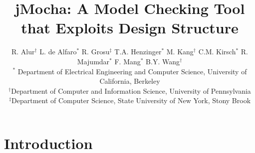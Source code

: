 \documentclass[10pt,twocolumn]{article}
\begin{document}
\title{{\sc jMocha}: A Model Checking Tool that Exploits Design Structure
}
\author{
  \hspace*{-6ex}
  \parbox{5in} 
  {\begin{center}
  {\authornamefont\normalsize 
   R. Alur$^\dag$\quad
   L. de Alfaro$^*$\quad
   R. Grosu$^\ddag$ \quad T.A. Henzinger$^*$
\quad M. Kang$^\dag$ \quad C.M. Kirsch$^*$ 
\quad R. Majumdar$^*$ \quad F. Mang$^*$ 
\quad B.Y. Wang$^\dag$}\\[1ex]
 {\small
  $^*$ Department of Electrical Engineering and Computer Science, University of California, Berkeley\\[1mm]
  $^\dag$Department of Computer and Information Science, University of Pennsylvania\\
  $^\ddag$Department of Computer Science, State University of New York, Stony
Brook}
 \end{center}}
}

\maketitle




\section{Introduction}
\label{sec:Introduction}
\end{document}
